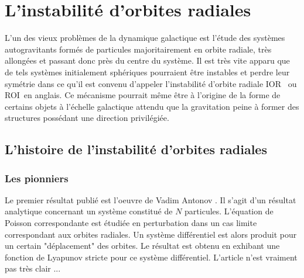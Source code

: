 \section{L'instabilit\'{e} d'orbites radiales}

L'un des vieux probl\`{e}mes de la dynamique galactique est
l'\'{e}tude des syst\`{e}mes autogravitants form\'{e}s de particules
majoritairement en orbite radiale, tr\`{e}s allong\'{e}es et passant donc pr\`{e}s
du centre du syst\`{e}me. Il est tr\`{e}s vite apparu que de tels syst\`{e}mes
initialement sph\'{e}riques pourraient \^{e}tre instables et perdre leur
sym\'{e}trie dans ce qu'il est convenu d'appeler l'instabilit\'{e} d'orbite
radiale IOR \ ou ROI\ en anglais. Ce m\'{e}canisme pourrait m\^{e}me \^{e}tre
\`{a} l'origine de la forme de certains objets \`{a} l'\'{e}chelle galactique
attendu que la gravitation peine \`{a} former des structures poss\'{e}dant une
direction privil\'{e}gi\'{e}e.


\subsection{L'histoire de l'instabilité d'orbites radiales}

\subsubsection{Les pionniers}

Le premier r\'{e}sultat publi\'{e} est l'oeuvre de Vadim Antonov
\cite{antonov}. Il s'agit d'un r\'{e}sultat analytique concernant un syst\`{e}me
constitu\'{e} de $N$ particules.  L'\'{e}quation de Poisson correspondante est
\'{e}tudi\'{e}e en perturbation dans un cas limite correspondant aux orbites
radiales. Un syst\`{e}me diff\'{e}rentiel est alors produit pour un certain
"d\'{e}placement" des orbites. Le r\'{e}sultat est obtenu en exhibant une
fonction de Lyapunov stricte pour ce syst\`{e}me diff\'{e}rentiel. L'article
n'est vraiment pas tr\`{e}s clair ...

